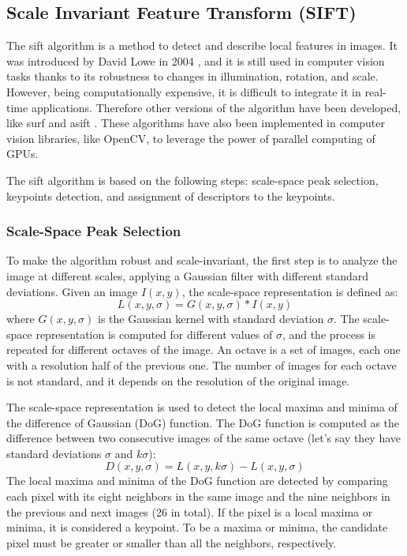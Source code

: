 \subsection{Scale Invariant Feature Transform (SIFT)}
The \ac{sift} algorithm is a method to detect and describe local features in 
images. It was introduced by David Lowe in 2004 \cite{lowe_sift}, and it is 
still used in computer vision tasks thanks to its robustness to changes in 
illumination, rotation, and scale. However, being computationally expensive, 
it is difficult to integrate it in real-time applications. Therefore other 
versions of the algorithm have been developed, like \ac{surf} \cite{surf} and
\ac{asift} \cite{asift}. These algorithms have also been implemented in 
computer vision libraries, like OpenCV, to leverage the power of parallel 
computing of GPUs.

The \ac{sift} algorithm is based on the following steps: scale-space peak
selection, keypoints detection, and assignment of descriptors to the keypoints.

\subsubsection*{Scale-Space Peak Selection}
To make the algorithm robust and scale-invariant, the first step is to analyze 
the image at different scales, applying a Gaussian filter with different 
standard deviations. Given an image $I(x, y)$, the scale-space representation 
is defined as: 
\begin{equation}
    L(x, y, \sigma) = G(x, y, \sigma) * I(x, y)
    \label{eq:scale_space}
\end{equation}
where $G(x, y, \sigma)$ is the Gaussian kernel with standard deviation $\sigma$.
The scale-space representation is computed for different values of $\sigma$, and 
the process is repeated for different octaves of the image. An octave is 
a set of images, each one with a resolution half of the previous one. The number 
of images for each octave is not standard, and it depends on the resolution 
of the original image.

The scale-space representation is used to detect the local maxima and minima 
of the difference of Gaussian (DoG) function. The DoG function is computed as 
the difference between two consecutive images of the same octave (let's say 
they have standard deviations $\sigma$ and $k\sigma$):
\begin{equation}
    D(x, y, \sigma) = L(x, y, k\sigma) - L(x, y, \sigma)
    \label{eq:dog}
\end{equation}
The local maxima and minima of the DoG function are detected by comparing each 
pixel with its eight neighbors in the same image and the nine neighbors in the 
previous and next images (26 in total). If the pixel is a local maxima or minima, it is 
considered a keypoint. To be a maxima or minima, the candidate pixel must be 
greater or smaller than all the neighbors, respectively.

